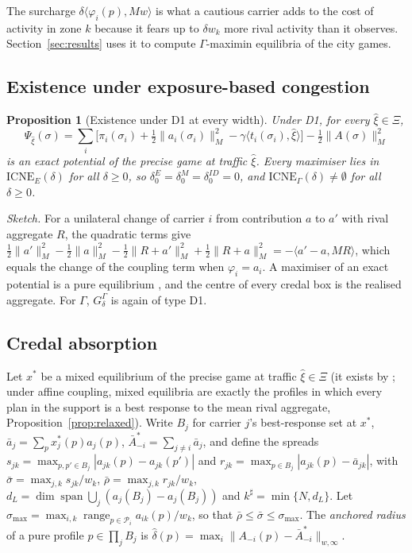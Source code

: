\documentclass[preprint,11pt]{elsarticle}
\newtheorem{proposition}[theorem]{Proposition}
\theoremstyle{definition}
\theoremstyle{remark}
\newcommand{\cP}{\mathcal{P}}
\newcommand{\abar}{\bar a}
\newcommand{\Abar}{\bar A}
\newcommand{\spn}{\operatorname{span}}
\newcommand{\ICNE}{\mathrm{ICNE}}
\newcommand{\ip}[2]{\langle #1,#2\rangle}
\begin{document}
The surcharge $\delta\ip{\varphi_i(p)}{Mw}$ is what a cautious carrier adds to the cost of activity in zone $k$ because it fears up to $\delta w_k$ more rival activity than it observes. Section~\ref{sec:results} uses it to compute $\Gamma$-maximin equilibria of the city games.

\subsection{Existence under exposure-based congestion}

\begin{proposition}[Existence under D1 at every width]\label{prop:D1}
Under D1, for every $\hat\xi\in\Xi$,
\[
\Psi_{\hat\xi}(\sigma)=\textstyle\sum_i\big[\pi_i(\sigma_i)+\tfrac12\|a_i(\sigma_i)\|_M^2-\gamma\ip{t_i(\sigma_i)}{\hat\xi}\big]-\tfrac12\|A(\sigma)\|_M^2
\]
is an exact potential of the precise game at traffic $\hat\xi$. Every maximiser lies in $\ICNE_E(\delta)$ for all $\delta\ge0$, so $\delta_0^E=\delta_0^M=\delta_0^{ID}=0$, and $\ICNE_\Gamma(\delta)\neq\emptyset$ for all $\delta\ge0$.
\end{proposition}

\emph{Sketch.} For a unilateral change of carrier $i$ from contribution $a$ to $a'$ with rival aggregate $R$, the quadratic terms give $\tfrac12\|a'\|_M^2-\tfrac12\|a\|_M^2-\tfrac12\|R+a'\|_M^2+\tfrac12\|R+a\|_M^2=-\ip{a'-a}{MR}$, which equals the change of the coupling term when $\varphi_i=a_i$. A maximiser of an exact potential is a pure equilibrium \citep{Monderer1996}, and the centre of every credal box is the realised aggregate. For $\Gamma$, $G^\Gamma_\delta$ is again of type D1.

\subsection{Credal absorption}

Let $x^*$ be a mixed equilibrium of the precise game at traffic $\hat\xi\in\Xi$ (it exists by \citealp{Nash1951}; under affine coupling, mixed equilibria are exactly the profiles in which every plan in the support is a best response to the mean rival aggregate, Proposition~\ref{prop:relaxed}). Write $B_j$ for carrier $j$'s best-response set at $x^*$, $\abar_j=\sum_px^*_j(p)a_j(p)$, $\Abar^*_{-i}=\sum_{j\ne i}\abar_j$, and define the spreads $s_{jk}=\max_{p,p'\in B_j}|a_{jk}(p)-a_{jk}(p')|$ and $r_{jk}=\max_{p\in B_j}|a_{jk}(p)-\abar_{jk}|$, with $\bar\sigma=\max_{j,k}s_{jk}/w_k$, $\bar\rho=\max_{j,k}r_{jk}/w_k$, $d_L=\dim\spn\bigcup_j(a_j(B_j)-a_j(B_j))$ and $k^\sharp=\min\{N,d_L\}$. Let $\sigma_{\max}=\max_{i,k}\operatorname{range}_{p\in\cP_i}a_{ik}(p)/w_k$, so that $\bar\rho\le\bar\sigma\le\sigma_{\max}$. The \emph{anchored radius} of a pure profile $p\in\prod_jB_j$ is $\hat\delta(p)=\max_i\|A_{-i}(p)-\Abar^*_{-i}\|_{w,\infty}$.
\end{document}
